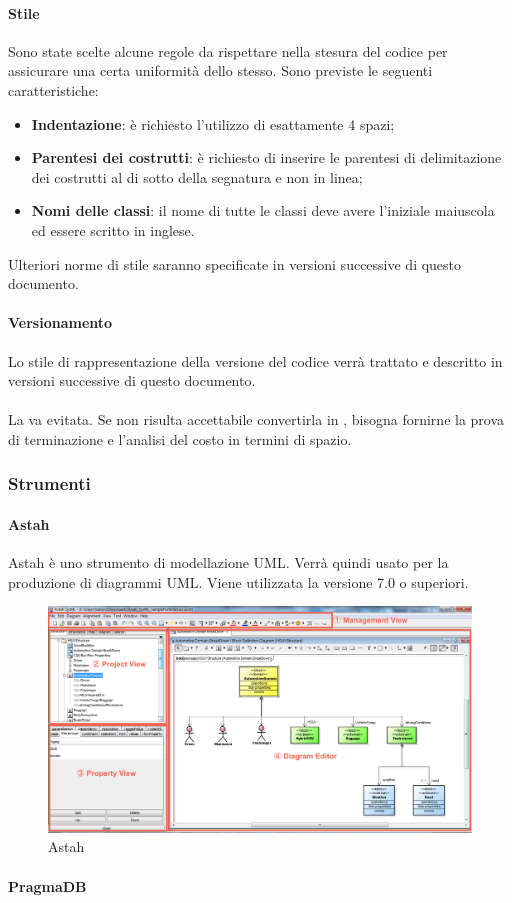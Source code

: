  \paragraph{Stile}
Sono state scelte alcune regole da rispettare nella stesura del codice per assicurare una certa uniformità dello stesso.
Sono previste le seguenti caratteristiche:
\begin{itemize}
	\item \textbf{Indentazione}: è richiesto l'utilizzo di esattamente 4 spazi;
	\item \textbf{Parentesi dei costrutti}: è richiesto di inserire le parentesi di delimitazione dei costrutti al di sotto della segnatura e non in linea;
	\item \textbf{Nomi delle classi}: il nome di tutte le classi deve avere l'iniziale maiuscola ed essere scritto in inglese.
\end{itemize}
Ulteriori norme di stile saranno specificate in versioni successive di questo documento.
 \paragraph{Versionamento}
 Lo stile di rappresentazione della versione del codice verrà trattato e descritto in versioni successive di questo documento.
 \paragraph{}
 La  va evitata. Se non risulta accettabile convertirla in , bisogna fornirne la prova di terminazione e l'analisi del costo in termini di spazio.
\subsubsection{Strumenti}
  \paragraph{Astah}
  Astah è uno strumento di modellazione UML. Verrà quindi usato per la produzione di diagrammi UML. Viene utilizzata la versione 7.0 o superiori.
\begin{figure}[h]
\centering
\includegraphics[scale=0.3]{img/astah.png}
\caption{Astah}\label{sec:Figura1}
\end{figure}
 \paragraph{PragmaDB}



  
